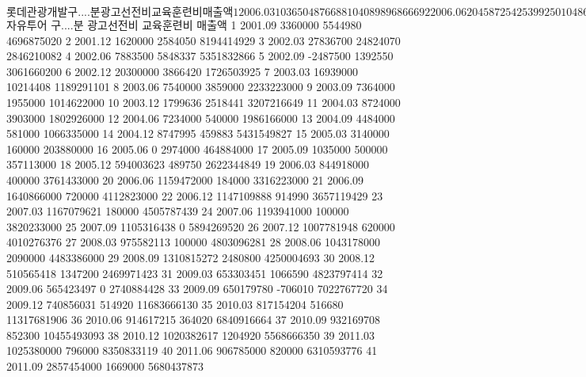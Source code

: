 \documentclass[tutorial.tex]{subfiles}
\begin{document}
\begin{Schunk}
\begin{Soutput}
$롯데관광개발
   구....분 광고선전비 교육훈련비      매출액
1   2006.03 1036504876    6881040  8989686669
2   2006.06 2045872542    5399250 10486867068
3   2006.09 2739658080   15348250 14941497865
4   2006.12 1254813126   21589250 12175786065
5   2007.03 1195205643   27700180 12366948305
6   2007.06 1309156992   26722010 11500679409
7   2007.09 1062194930   32002591 16877064858
8   2007.12  986694351   19226091 10845317936
9   2008.03  977711617   23188682 12954724212
10  2008.06  984506080   24090040 11001911869
11  2008.09 1158096243   36495000 10797072664
12  2008.12  486885406   25375633  6545406791
13  2009.03  477624164   19607350  5582468824
14  2009.06  569612024   20698260  7088618820
15  2009.09  600097366   28783950  7726065331
16  2009.12  546760303   18322830  5515137791
17  2010.03  660158348   28187000  7761111255
18  2010.06  613649450   17553344  8633822363
19  2010.09  609214711   30269450 12561340891
20  2010.12  665034444   18269420  9821126136
21  2011.03  607102000          0  9707491187
22  2011.06  670256000   58419000 11048769593
23  2011.09  796352000   27963000 13488179269

$자유투어
   구....분 광고선전비 교육훈련비      매출액
1   2001.09    3360000    5544980  4696875020
2   2001.12    1620000    2584050  8194414929
3   2002.03   27836700   24824070  2846210082
4   2002.06    7883500    5848337  5351832866
5   2002.09   -2487500    1392550  3061660200
6   2002.12   20300000    3866420  1726503925
7   2003.03   16939000   10214408  1189291101
8   2003.06    7540000    3859000  2233223000
9   2003.09    7364000    1955000  1014622000
10  2003.12    1799636    2518441  3207216649
11  2004.03    8724000    3903000  1802926000
12  2004.06    7234000     540000  1986166000
13  2004.09    4484000     581000  1066335000
14  2004.12    8747995     459883  5431549827
15  2005.03    3140000     160000   203880000
16  2005.06          0    2974000   464884000
17  2005.09    1035000     500000   357113000
18  2005.12  594003623     489750  2622344849
19  2006.03  844918000     400000  3761433000
20  2006.06 1159472000     184000  3316223000
21  2006.09 1640866000     720000  4112823000
22  2006.12 1147109888     914990  3657119429
23  2007.03 1167079621     180000  4505787439
24  2007.06 1193941000     100000  3820233000
25  2007.09 1105316438          0  5894269520
26  2007.12 1007781948     620000  4010276376
27  2008.03  975582113     100000  4803096281
28  2008.06 1043178000    2090000  4483386000
29  2008.09 1310815272    2480800  4250004693
30  2008.12  510565418    1347200  2469971423
31  2009.03  653303451    1066590  4823797414
32  2009.06  565423497          0  2740884428
33  2009.09  650179780    -706010  7022767720
34  2009.12  740856031     514920 11683666130
35  2010.03  817154204     516680 11317681906
36  2010.06  914617215     364020  6840916664
37  2010.09  932169708     852300 10455493093
38  2010.12 1020382617    1204920  5568666350
39  2011.03 1025380000     796000  8350833119
40  2011.06  906785000     820000  6310593776
41  2011.09 2857454000    1669000  5680437873


\end{Soutput}
\end{Schunk}
\end{document}
